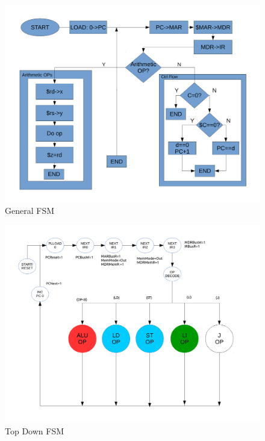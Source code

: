 \documentclass[conference]{IEEEtran}
\begin{document}
\clearpage
\begin{figure}[!t]
\centering
\includegraphics[width=\textwidth]{TopDownDesignDraftp2.pdf}
\caption{General FSM}
\label{fig_sim}
\end{figure}

\clearpage

\begin{figure}[!t]
\centering
\includegraphics[width=\textwidth]{ControlFSMp1.pdf}
\caption{Top Down FSM}
\label{fig_sim}
\end{figure}


\clearpage
\end{document}

